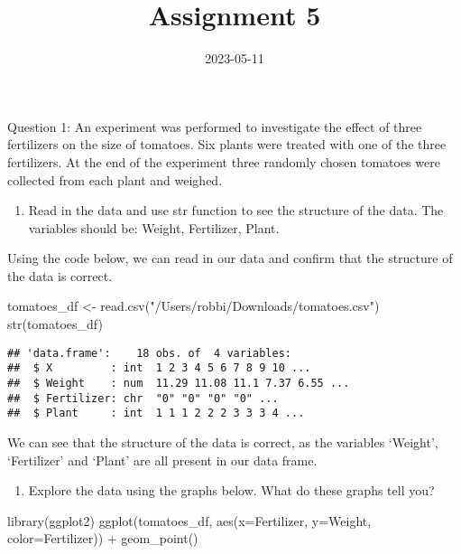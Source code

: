 \documentclass[
]{article}
\title{Assignment 5}
\author{}
\date{\vspace{-2.5em}2023-05-11}
\newenvironment{Shaded}{\begin{snugshade}}{\end{snugshade}}
\newcommand{\AttributeTok}[1]{\textcolor[rgb]{0.77,0.63,0.00}{#1}}
\newcommand{\FunctionTok}[1]{\textcolor[rgb]{0.00,0.00,0.00}{#1}}
\newcommand{\NormalTok}[1]{#1}
\newcommand{\OtherTok}[1]{\textcolor[rgb]{0.56,0.35,0.01}{#1}}
\newcommand{\SpecialCharTok}[1]{\textcolor[rgb]{0.00,0.00,0.00}{#1}}
\newcommand{\StringTok}[1]{\textcolor[rgb]{0.31,0.60,0.02}{#1}}
\providecommand{\tightlist}{%
  \setlength{\itemsep}{0pt}\setlength{\parskip}{0pt}}
\begin{document}
\maketitle

Question 1: An experiment was performed to investigate the effect of
three fertilizers on the size of tomatoes. Six plants were treated with
one of the three fertilizers. At the end of the experiment three
randomly chosen tomatoes were collected from each plant and weighed.

\begin{enumerate}
\def\labelenumi{\alph{enumi}.}
\tightlist
\item
  Read in the data and use str function to see the structure of the
  data. The variables should be: Weight, Fertilizer, Plant.
\end{enumerate}

Using the code below, we can read in our data and confirm that the
structure of the data is correct.

\begin{Shaded}
\begin{Highlighting}[]
\NormalTok{tomatoes\_df }\OtherTok{\textless{}{-}} \FunctionTok{read.csv}\NormalTok{(}\StringTok{"/Users/robbi/Downloads/tomatoes.csv"}\NormalTok{)}
\FunctionTok{str}\NormalTok{(tomatoes\_df)}
\end{Highlighting}
\end{Shaded}

\begin{verbatim}
## 'data.frame':    18 obs. of  4 variables:
##  $ X         : int  1 2 3 4 5 6 7 8 9 10 ...
##  $ Weight    : num  11.29 11.08 11.1 7.37 6.55 ...
##  $ Fertilizer: chr  "0" "0" "0" "0" ...
##  $ Plant     : int  1 1 1 2 2 2 3 3 3 4 ...
\end{verbatim}

We can see that the structure of the data is correct, as the variables
`Weight', `Fertilizer' and `Plant' are all present in our data frame.

\begin{enumerate}
\def\labelenumi{\alph{enumi}.}
\setcounter{enumi}{1}
\tightlist
\item
  Explore the data using the graphs below. What do these graphs tell
  you?
\end{enumerate}

\begin{Shaded}
\begin{Highlighting}[]
\FunctionTok{library}\NormalTok{(ggplot2)}
\FunctionTok{ggplot}\NormalTok{(tomatoes\_df, }\FunctionTok{aes}\NormalTok{(}\AttributeTok{x=}\NormalTok{Fertilizer, }\AttributeTok{y=}\NormalTok{Weight, }\AttributeTok{color=}\NormalTok{Fertilizer)) }\SpecialCharTok{+} \FunctionTok{geom\_point}\NormalTok{()}
\end{Highlighting}
\end{Shaded}
\end{document}
